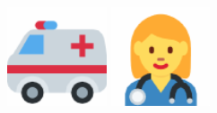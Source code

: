 \documentclass{beamer}
\begin{document}
\begin{frame}
\begin{center}
\includegraphics[width=0.22\textwidth]{ambulance}\hspace{3mm}
\includegraphics[width=0.22\textwidth]{doctorf}\\
\end{center}
\end{frame}
\end{document}
